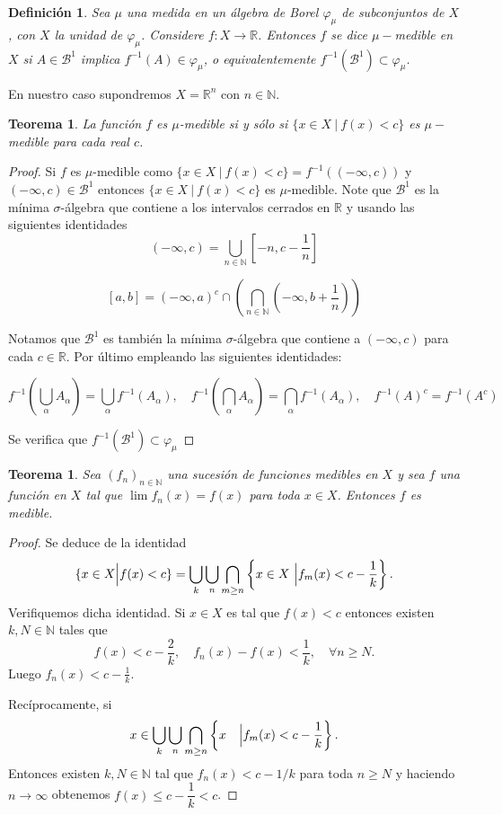 \documentclass[twoside,12pt,a4 paper,openright]{book}
\newtheorem{teo}[claim]{Teorema}
\newtheorem{defi}[claim]{Definici\'on}
\begin{document}
\begin{defi}
    Sea  $\mu$  una medida  en un \'algebra de Borel $\varphi_\mu$ de subconjuntos de $X$, con $X$ la unidad de $\varphi_\mu$. Considere $f:X\to\mathbb{R}$. Entonces $f$ se dice $\mu-$medible en $X$ si $A\in \mathcal{B}^1$ implica $f^{-1}(A)\in \varphi_\mu$, o equivalentemente $f^{-1}(\mathcal{B}^1)\subset \varphi_\mu$. 
\end{defi}
En nuestro caso supondremos $X=\mathbb R^n$ con $n\in \mathbb N$.
 
\begin{teo}
    La funci\'on $f$ es $\mu$-medible si y s\'olo si $\{x\in X \ | \  f(x)<c\}$ es $\mu-$medible para cada real $c$.
\end{teo}
\begin{proof}
    Si $f$ es $\mu$-medible como $\{x\in X \ | \ f(x)<c\} = f^{-1}((-\infty,c))$ y $(-\infty,c)\in \mathcal{B}^1$ entonces $\{x\in X \ | \  f(x)<c\}$ es $\mu$-medible. Note que $\mathcal{B}^1$ es la m\'inima $\sigma$-\'algebra que contiene a los intervalos cerrados en $\mathbb{R}$ y usando las siguientes identidades
    $$(-\infty,c) = \bigcup_{n\in \mathbb{N}} \left[-n, c - \frac{1}{n}\right]$$

    $$[a,b] = (-\infty,a)^c\cap \left(\bigcap_{n\in \mathbb{N}}\left(-\infty, b + \frac{1}{n}\right)\right)$$

    Notamos que $\mathcal{B}^1$ es tambi\'en la m\'inima $\sigma$-\'algebra que contiene a $(-\infty,c)$ para cada $c\in \mathbb{R}$. Por \'ultimo empleando las siguientes identidades:

    $$f^{-1}\left(\bigcup_{\alpha}A_\alpha\right) = \bigcup_\alpha f^{-1}(A_\alpha), \quad f^{-1}\left(\bigcap_{\alpha}A_\alpha\right) = \bigcap_\alpha f^{-1}(A_\alpha), \quad  f^{-1}(A)^c = f^{-1}(A^c)$$

    Se verifica que $f^{-1}(\mathcal{B}^1)\subset\varphi_\mu$
\end{proof}
\begin{teo}\label{convergmed}
    Sea $(f_n)_{n\in \mathbb{N}}$ una sucesi\'on de funciones medibles en $X$ y sea $f$ una funci\'on en $X$ tal que $\lim f_n(x) = f(x)$ para toda $x\in X$. Entonces $f$ es medible. 
\end{teo} 
\begin{proof}
    Se deduce de la identidad 
    $$\{x \in X \Big{|} f(x)<c\} = \bigcup_k\bigcup_n \bigcap_{m\geq n}\left\{ x \in X \  \Big{|} f_m(x)< c - \frac{1}{k}\right\}.$$
    Verifiquemos dicha identidad. Si  $x\in X$ es tal que $f(x)< c$ entonces  existen $k,N\in \mathbb{N}$ tales que
 $$f(x)< c -\frac{2}{k}, \quad f_n(x) - f(x)< \frac{1}{k}, \quad \forall n \geq N.$$ Luego $f_n(x)< c - \frac{1}{k}$.  

\noindent
Rec\'iprocamente, si 
    $$x\in \bigcup_k\bigcup_n \bigcap_{m\geq n}\left\{ x\quad \Big{|} f_m(x)< c - \frac{1}{k}\right\}.$$
Entonces existen  $k,N\in \mathbb{N}$ tal que $f_n(x)< c- 1/k$ para toda $n\geq N$ y haciendo $n\to \infty $ obtenemos $f(x)\leq  c - \dfrac{1}{k}<c$.
\end{proof}
\end{document}
